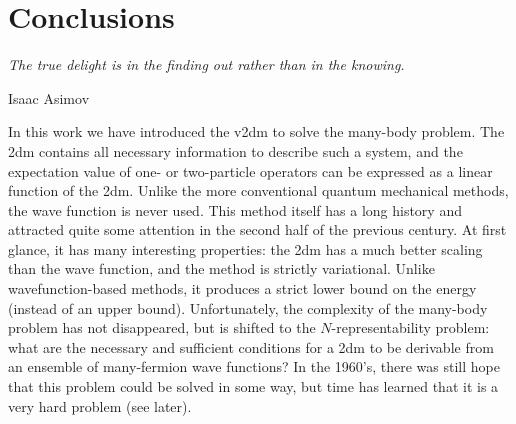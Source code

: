\chapter{Conclusions}\label{ch6}
\setlength{\epigraphrule}{0pt}
\setlength{\epigraphwidth}{0.75\textwidth}
\epigraph{\textit{The true delight is in the finding out rather than in the knowing.}}{Isaac Asimov}


In this work we have introduced the \acrlong{v2dm} to solve the many-body problem.
The \acrfull{2dm} contains all necessary information to describe such a system, and the expectation value of one- or two-particle operators
can be expressed as a linear function of the \gls{2dm}.
Unlike the more conventional quantum mechanical methods, the wave function is never used. This method itself has a long history and attracted quite some attention in the second half of
the previous century. At first glance, it has many interesting properties: the \gls{2dm} has a much better scaling than the wave function,
and the method is strictly variational. Unlike wavefunction-based methods, it produces a strict lower bound on the energy (instead of an
upper bound).
Unfortunately, the complexity of the many-body problem has not disappeared, but is shifted to the $N$-representability problem: what are the
necessary and sufficient conditions for a \gls{2dm} to be derivable from an ensemble of many-fermion wave functions?
In the 1960's, there was still hope that this problem could be solved in some way, but time has learned that it is a very hard problem (see
later).

